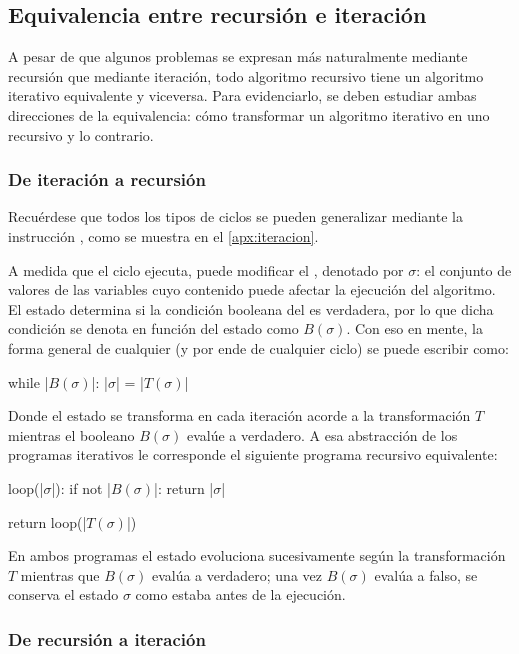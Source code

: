 \subsection{Equivalencia entre recursión e iteración}

A pesar de que algunos problemas se expresan más naturalmente mediante recursión que mediante iteración, todo algoritmo recursivo tiene un algoritmo iterativo equivalente y viceversa. Para evidenciarlo, se deben estudiar ambas direcciones de la equivalencia: cómo transformar un algoritmo iterativo en uno recursivo y lo contrario.

\subsubsection{De iteración a recursión}

Recuérdese que todos los tipos de ciclos se pueden generalizar mediante la instrucción , como se muestra en el \ref{apx:iteracion}.

A medida que el ciclo  ejecuta, puede modificar el , denotado por \(\sigma\): el conjunto de valores de las variables cuyo contenido puede afectar la ejecución del algoritmo. El estado determina si la condición booleana del  es verdadera, por lo que dicha condición se denota en función del estado como \(B(\sigma)\). Con eso en mente, la forma general de cualquier  (y por ende de cualquier ciclo) se puede escribir como:
\begin{pseudocode}
while |\(B(\sigma)\)|:
    |\(\sigma\)| = |\(T(\sigma)\)|
\end{pseudocode}
Donde el estado se transforma en cada iteración acorde a la transformación \(T\) mientras el booleano \(B(\sigma)\) evalúe a verdadero. A esa abstracción de los programas iterativos le corresponde el siguiente programa recursivo equivalente:
\begin{pseudocode}
loop(|\(\sigma\)|):
    if not |\(B(\sigma)\)|:
        return |\(\sigma\)|

    return loop(|\(T(\sigma)\)|)
\end{pseudocode}
En ambos programas el estado evoluciona sucesivamente según la transformación \(T\) mientras que \(B(\sigma)\) evalúa a verdadero; una vez \(B(\sigma)\) evalúa a falso, se conserva el estado \(\sigma\) como estaba antes de la ejecución.

\subsubsection{De recursión a iteración}

